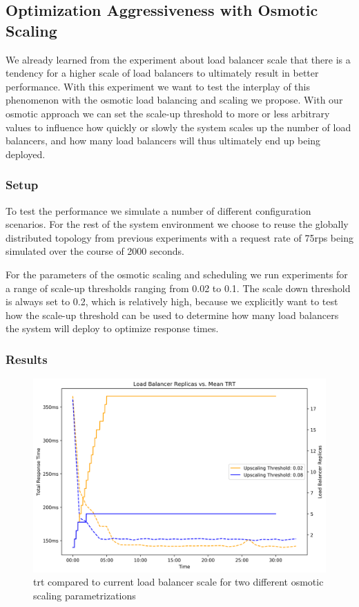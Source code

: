 \subsection{Optimization Aggressiveness with Osmotic Scaling}
We already learned from the experiment about load balancer scale that there is a tendency for a higher scale of load balancers to ultimately result in better performance.
With this experiment we want to test the interplay of this phenomenon with the osmotic load balancing and scaling we propose. With our osmotic approach we can set the scale-up threshold to more or less arbitrary values to influence how quickly or slowly the system scales up the number of load balancers, and how many load balancers will thus ultimately end up being deployed.

\subsubsection{Setup}
To test the performance we simulate a number of different configuration scenarios. For the rest of the system environment we choose to reuse the globally distributed topology from previous experiments with a request rate of 75\gls{rps} being simulated over the course of 2000 seconds.

For the parameters of the osmotic scaling and scheduling we run experiments for a range of scale-up thresholds ranging from 0.02 to 0.1.
The scale down threshold is always set to 0.2, which is relatively high, because we explicitly want to test how the scale-up threshold can be used to determine how many load balancers the system will deploy to optimize response times.

\subsubsection{Results}



\begin{figure}
    \centering
    \includegraphics[width=12cm]{graphics/graphs/osmotic_optim_thres_vs_trt_corrected.png}
    \caption{\gls{trt} compared to current load balancer scale for two different osmotic scaling parametrizations}
    \label{fig:osmotic_trt_vs_replica_scale}
\end{figure}

